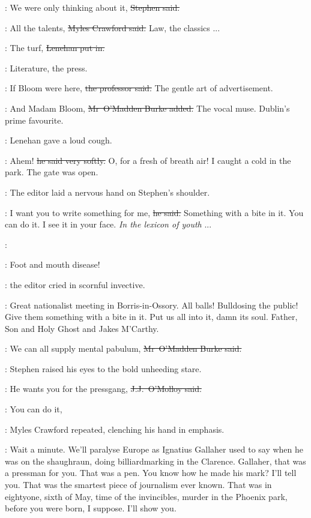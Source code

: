\Stephen:
We were only thinking about it,
\sout{Stephen said.}

\crawford:
All the talents,
\sout{Myles Crawford said.}
Law,
the classics ...

\lenehan:
The turf,
\sout{Lenehan put in.}

\crawford:
Literature,
the press.

\machugh:
If Bloom were here,
\sout{the professor said.}
The gentle art of advertisement.

\omaddenburke:
And Madam Bloom,
\sout{Mr~O'Madden Burke added.}
The vocal muse.
Dublin's prime favourite.%

:
Lenehan gave a loud cough.

\lenehan:
Ahem!
\sout{he said very softly.}
O, for a fresh of breath air!
I caught a cold in the park.
The gate was open.



:
The editor laid a nervous hand on Stephen's shoulder.

\crawford:
I want you to write something for me,
\sout{he said.}
Something with a bite in it.
You can do it.
I see it in your face.
\emph{In the lexicon of youth} ...

\StephenInt:

\crawford:
Foot and mouth disease!

:
the editor cried in scornful invective.

\crawford:
Great nationalist meeting in Borris-in-Ossory.
All balls!
Bulldosing the public!
Give them something with a bite in it.
Put us all into it,
damn its soul.
Father, Son and Holy Ghost
and Jakes M'Carthy.

\omaddenburke:
We can all supply mental pabulum,
\sout{Mr~O'Madden Burke said.}

:
Stephen raised his eyes to the bold unheeding stare.

\jjom:
He wants you for the pressgang,
\sout{J.J.~O'Molloy said.}



\crawford:
You can do it,

:
Myles Crawford repeated,
clenching his hand in emphasis.

\crawford:
Wait a minute.
We'll paralyse Europe as Ignatius Gallaher used to say
when he was on the shaughraun,
doing billiardmarking in the Clarence.
Gallaher, that was a pressman for you.
That was a pen.
You know how he made his mark?
I'll tell you.
That was the smartest piece of journalism ever known.
That was in eightyone, sixth of May,
time of the invincibles,
murder in the Phoenix park,
before you were born, I suppose.
I'll show you.


